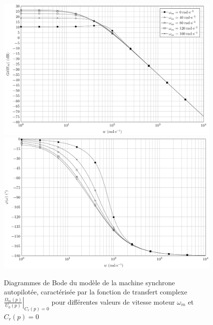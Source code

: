 \begin{figure}[!h]
 \centering\includegraphics[width=0.7\linewidth]{img/figure_E1}\\
 \centering\includegraphics[width=0.7\linewidth]{img/figure_E2}
 \caption{Diagrammes de Bode du modèle de la machine synchrone autopilotée, caractérisée par la fonction de transfert complexe$\left.\frac{\Omega_m(p)}{U_0(p)}\right|_{C_r(p)=0}$ pour différentes valeurs de vitesse moteur $\omega_m$ et $C_r(p)=0$}
 \label{imgE}
\end{figure}

\newpage





\newpage


